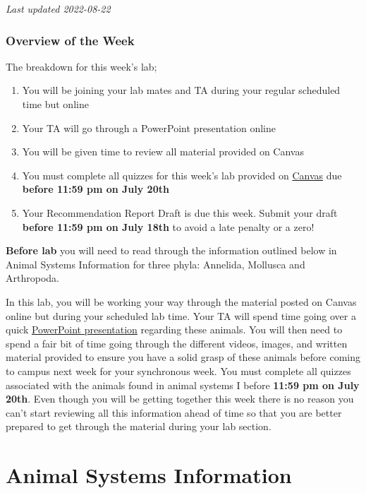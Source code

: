 \documentclass[
]{book}
\providecommand{\tightlist}{%
  \setlength{\itemsep}{0pt}\setlength{\parskip}{0pt}}
\begin{document}
\emph{Last updated 2022-08-22}

\hypertarget{overview-of-the-week}{%
\subsection*{Overview of the Week}\label{overview-of-the-week}}

The breakdown for this week's lab;

\begin{enumerate}
\def\labelenumi{\arabic{enumi}.}
\tightlist
\item
  You will be joining your lab mates and TA during your regular scheduled time but online
\item
  Your TA will go through a PowerPoint presentation online
\item
  You will be given time to review all material provided on Canvas
\item
  You must complete all quizzes for this week's lab provided on \href{https://canvas.ubc.ca/}{Canvas} due \textbf{before 11:59 pm on July 20th}
\item
  Your Recommendation Report Draft is due this week. Submit your draft \textbf{before 11:59 pm on July 18th} to avoid a late penalty or a zero!
\end{enumerate}

\textbf{Before lab} you will need to read through the information outlined below in Animal Systems Information for three phyla: Annelida, Mollusca and Arthropoda.

In this lab, you will be working your way through the material posted on Canvas online but during your scheduled lab time. Your TA will spend time going over a quick \href{https://osf.io/download/b2v8t}{PowerPoint presentation} regarding these animals. You will then need to spend a fair bit of time going through the different videos, images, and written material provided to ensure you have a solid grasp of these animals before coming to campus next week for your synchronous week. You must complete all quizzes associated with the animals found in animal systems I before \textbf{11:59 pm on July 20th}. Even though you will be getting together this week there is no reason you can't start reviewing all this information ahead of time so that you are better prepared to get through the material during your lab section.

\hypertarget{animal-systems-information}{%
\chapter*{Animal Systems Information}\label{animal-systems-information}}
\end{document}
